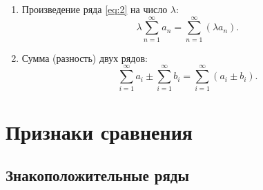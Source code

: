 \documentclass[12pt]{report}
\begin{document}
\begin{enumerate}
\item Произведение ряда \eqref{eq:2} на число $\lambda$:
\[ \lambda \sum_{n = 1}^{\infty} a_n = \sum_{n = 1}^{\infty} (\lambda a_n).\]
\item Сумма (разность) двух рядов:
\[ \sum_{i = 1}^{\infty} a_i \pm \sum_{i = 1}^{\infty} b_i = \sum_{i = 1}^{\infty} (a_i \pm b_i).\]
\end{enumerate}

\section{Признаки сравнения}
\subsection{Знакоположительные ряды}
\end{document}
